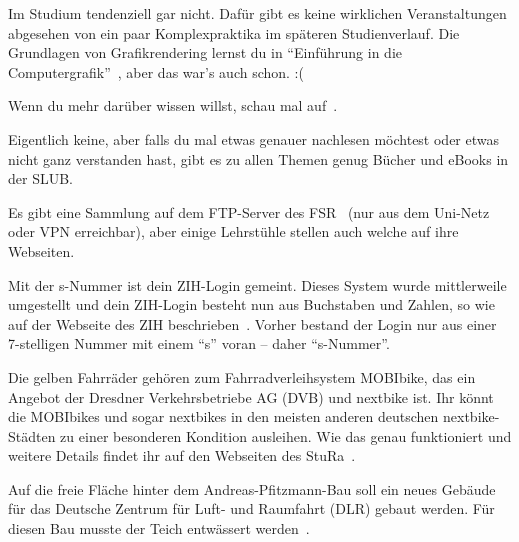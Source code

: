 Im Studium tendenziell gar nicht. Dafür gibt es keine wirklichen Veranstaltungen abgesehen von ein paar Komplexpraktika im späteren Studienverlauf. Die Grundlagen von Grafikrendering lernst du in \enquote{Einführung in die Computergrafik}~, aber das war's auch schon. :(

\label{minisec:faq}
Wenn du mehr darüber wissen willst, schau mal auf~.

Eigentlich keine, aber falls du mal etwas genauer nachlesen möchtest oder etwas nicht ganz verstanden hast, gibt es zu allen Themen genug Bücher und eBooks in der SLUB.~


Es gibt eine Sammlung auf dem FTP-Server des FSR~ (nur aus dem Uni-Netz oder VPN erreichbar), aber einige Lehrstühle stellen auch welche auf ihre Webseiten.

Mit der s-Nummer ist dein ZIH-Login gemeint. Dieses System wurde mittlerweile umgestellt und dein ZIH-Login besteht nun aus Buchstaben und Zahlen, so wie auf der Webseite des ZIH beschrieben~. Vorher bestand der Login nur aus einer 7-stelligen Nummer mit einem \enquote{s} voran -- daher \enquote{s-Nummer}.

Die gelben Fahrräder gehören zum Fahrradverleihsystem MOBIbike, das ein Angebot der Dresdner Verkehrsbetriebe AG (DVB) und nextbike ist. Ihr könnt die MOBIbikes und sogar nextbikes in den meisten anderen deutschen nextbike-Städten zu einer besonderen Kondition ausleihen. Wie das genau funktioniert und weitere Details findet ihr auf den Webseiten des StuRa~.

Auf die freie Fläche hinter dem Andreas-Pfitzmann-Bau soll ein neues Gebäude für das Deutsche Zentrum für Luft- und Raumfahrt (DLR) gebaut werden. Für diesen Bau musste der Teich entwässert werden~.
